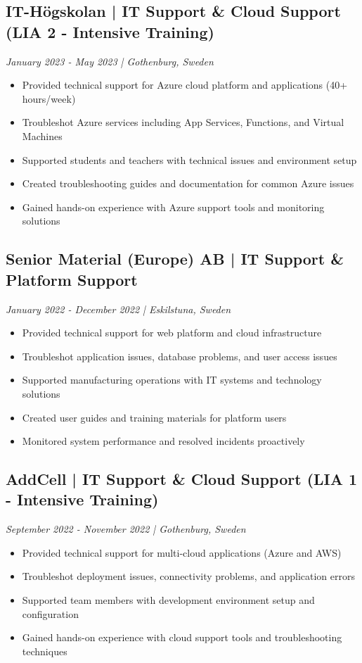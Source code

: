 \documentclass[11pt,a4paper]{article}
\begin{document}
\subsection*{IT-Högskolan | IT Support \& Cloud Support (LIA 2 - Intensive Training)}
\textit{January 2023 - May 2023 | Gothenburg, Sweden}
\begin{itemize}[noitemsep]
\item Provided technical support for Azure cloud platform and applications (40+ hours/week)
\item Troubleshot Azure services including App Services, Functions, and Virtual Machines
\item Supported students and teachers with technical issues and environment setup
\item Created troubleshooting guides and documentation for common Azure issues
\item Gained hands-on experience with Azure support tools and monitoring solutions
\end{itemize}

\subsection*{Senior Material (Europe) AB | IT Support \& Platform Support}
\textit{January 2022 - December 2022 | Eskilstuna, Sweden}
\begin{itemize}[noitemsep]
\item Provided technical support for web platform and cloud infrastructure
\item Troubleshot application issues, database problems, and user access issues
\item Supported manufacturing operations with IT systems and technology solutions
\item Created user guides and training materials for platform users
\item Monitored system performance and resolved incidents proactively
\end{itemize}

\subsection*{AddCell | IT Support \& Cloud Support (LIA 1 - Intensive Training)}
\textit{September 2022 - November 2022 | Gothenburg, Sweden}
\begin{itemize}[noitemsep]
\item Provided technical support for multi-cloud applications (Azure and AWS)
\item Troubleshot deployment issues, connectivity problems, and application errors
\item Supported team members with development environment setup and configuration
\item Gained hands-on experience with cloud support tools and troubleshooting techniques
\end{itemize}
\end{document}
